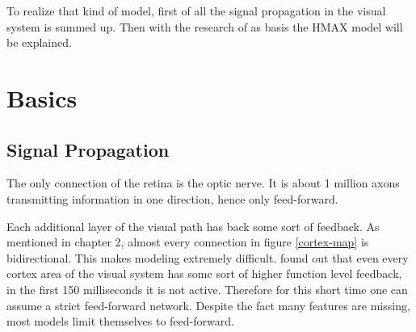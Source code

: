 	To realize that kind of model, first of all the signal propagation in the visual system is summed up. Then with the research of \citep{hubel1962receptive} as basis the HMAX model will be explained.

%		
%		
%		
%		
%		
%
%			
%			
	
	\section{Basics}
			
		\subsection{Signal Propagation}\label{signal}
			
			The only connection of the retina is the optic nerve. It is about 1 million axons transmitting information in one direction, hence only feed-forward.
			
			Each additional layer of the visual path has back some sort of feedback. As mentioned in chapter 2, almost every connection in figure \ref{cortex-map} is bidirectional. This makes modeling extremely difficult. \citeauthor{thorpe1996speed} found out that even every cortex area of the visual system has some sort of higher function level feedback, in the first 150 milliseconds it is not active. Therefore for this short time one can assume a strict feed-forward network. Despite the fact many features are missing, most models limit themselves to feed-forward.
			
